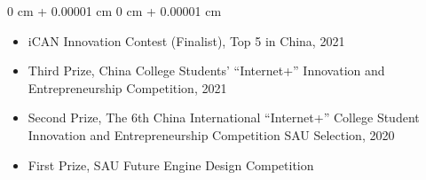\documentclass[10pt, letterpaper]{article}
\newenvironment{highlights}{
    \begin{itemize}[
        topsep=0.10 cm,
        parsep=0.10 cm,
        partopsep=0pt,
        itemsep=0pt,
        leftmargin=0 cm + 10pt
    ]
}{
    \end{itemize}
} %
\newenvironment{onecolentry}{
    \begin{adjustwidth}{
        0 cm + 0.00001 cm
    }{
        0 cm + 0.00001 cm
    }
}{
    \end{adjustwidth}
} %
\begin{document}
    \vspace{0.10 cm}
    \begin{onecolentry}
        \begin{highlights}
            \item iCAN Innovation Contest (Finalist), Top 5 in China, 2021
            \item Third Prize, China College Students' “Internet+” Innovation and Entrepreneurship Competition, 2021
            \item Second Prize, The 6th China International “Internet+” College Student Innovation and Entrepreneurship Competition SAU Selection, 2020
            \item First Prize, SAU Future Engine Design Competition
        \end{highlights}
    \end{onecolentry}
\end{document}
